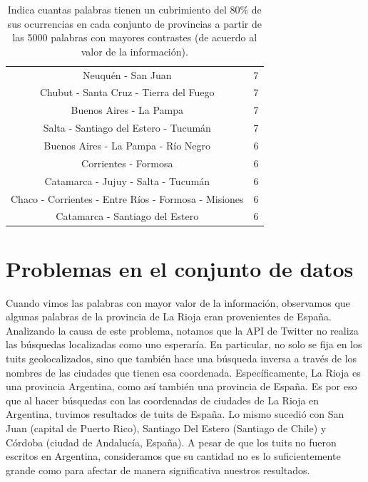 \begin{table}
\begin{tabular}{|c|c|}
Neuquén - San Juan                                    & 7           \\ %
Chubut - Santa Cruz - Tierra del Fuego                 & 7           \\
Buenos Aires - La Pampa                                & 7           \\
Salta - Santiago del Estero - Tucumán                  & 7           \\
Buenos Aires - La Pampa - Río Negro                     & 6           \\
Corrientes - Formosa                                  & 6           \\
Catamarca - Jujuy - Salta - Tucumán                     & 6           \\
Chaco - Corrientes - Entre Ríos - Formosa - Misiones     & 6           \\
Catamarca - Santiago del Estero                       & 6           \\
\hline
\end{tabular}
\caption{Indica cuantas palabras tienen un cubrimiento del 80\% de sus ocurrencias en cada conjunto de provincias a partir de las 5000 palabras con mayores contrastes (de acuerdo al valor de la información).}
\label{tab:regiones}
\end{table}


\section{Problemas en el conjunto de datos}
\label{problemas_datos}

Cuando vimos las palabras con mayor valor de la información, observamos que algunas palabras de la provincia de La Rioja eran provenientes de España. Analizando la causa de este problema, notamos que la API de Twitter no realiza las búsquedas localizadas como uno esperaría. En particular, no solo se fija en los tuits geolocalizados, sino que también hace una búsqueda inversa a través de los nombres de las ciudades que tienen esa coordenada. Específicamente, La Rioja es una provincia Argentina, como así también una provincia de España. Es por eso que al hacer búsquedas con las coordenadas de ciudades de La Rioja en Argentina, tuvimos resultados de tuits de España. Lo mismo sucedió con San Juan (capital de Puerto Rico), Santiago Del Estero (Santiago de Chile) y Córdoba (ciudad de Andalucía, España). A pesar de que los tuits no fueron escritos en Argentina, consideramos que su cantidad no es lo suficientemente grande como para afectar de manera significativa nuestros resultados.

